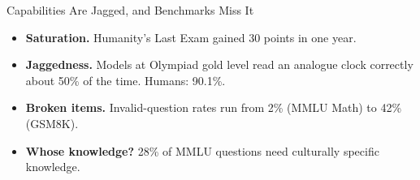 \begin{frame}{Capabilities Are Jagged, and Benchmarks Miss It}
    \begin{itemize}\itemsep0.7em
        \item \textbf{Saturation.} Humanity's Last Exam gained 30 points in one year.
        \item \textbf{Jaggedness.} Models at Olympiad gold level read an analogue clock correctly about 50\% of the time. Humans: 90.1\%.
        \item \textbf{Broken items.} Invalid-question rates run from 2\% (MMLU Math) to 42\% (GSM8K).
        \item \textbf{Whose knowledge?} 28\% of MMLU questions need culturally specific knowledge.
    \end{itemize}
    \vspace{0.4em}
\end{frame}


